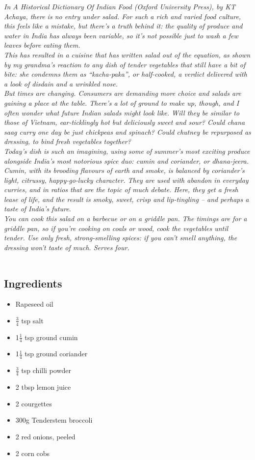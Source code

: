 \documentclass{book}
\begin{document}
\emph{In A Historical Dictionary Of Indian Food (Oxford University Press), by KT Achaya, there is no entry under salad. For such a rich and varied food culture, this feels like a mistake, but there’s a truth behind it: the quality of produce and water in India has always been variable, so it’s not possible just to wash a few leaves before eating them.\\ 
This has resulted in a cuisine that has written salad out of the equation, as shown by my grandma’s reaction to any dish of tender vegetables that still have a bit of bite: she condemns them as “kacha-paka”, or half-cooked, a verdict delivered with a look of disdain and a wrinkled nose.\\ 
But times are changing. Consumers are demanding more choice and salads are gaining a place at the table. There’s a lot of ground to make up, though, and I often wonder what future Indian salads might look like. Will they be similar to those of Vietnam, ear-ticklingly hot but deliciously sweet and sour? Could chana saag curry one day be just chickpeas and spinach? Could chutney be repurposed as dressing, to bind fresh vegetables together?\\ 
Today’s dish is such an imagining, using some of summer’s most exciting produce alongside India’s most notorious spice duo: cumin and coriander, or dhana-jeera. Cumin, with its brooding flavours of earth and smoke, is balanced by coriander’s light, citrussy, happy-go-lucky character. They are used with abandon in everyday curries, and in ratios that are the topic of much debate. Here, they get a fresh lease of life, and the result is smoky, sweet, crisp and lip-tingling – and perhaps a taste of India’s future.\\ 
You can cook this salad on a barbecue or on a griddle pan. The timings are for a griddle pan, so if you’re cooking on coals or wood, cook the vegetables until tender. Use only fresh, strong-smelling spices: if you can’t smell anything, the dressing won’t taste of much. Serves four.}\\\\ 
\subsection*{Ingredients}
\begin{itemize}
\item Rapeseed oil
\item $\frac{3}{4}$ tsp salt
\item 1$\frac{1}{4}$ tsp ground cumin
\item 1$\frac{1}{4}$ tsp ground coriander
\item $\frac{3}{4}$ tsp chilli powder
\item 2 tbsp lemon juice 
\item 2 courgettes
\item 300g Tenderstem broccoli
\item 2 red onions, peeled 
\item 2 corn cobs
\end{itemize}
\end{document}
